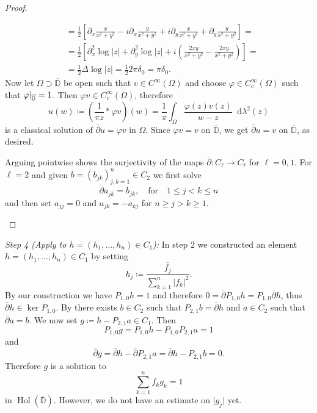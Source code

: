 \documentclass[letterpaper, 11pt]{article}
\newcommand{\D}{\mathbb{D}}
\newcommand{\1}{\mathds{1}}
\newcommand{\dd}{\mathop{}\!\mathrm{d}}
\newcommand{\cl}[1]{\overline{#1}}
\newcommand{\restr}[2]{{%
  \left.\kern-\nulldelimiterspace %
  #1 %
  \littletaller %
  \right|_{#2} %
  }}
\newcommand{\littletaller}{\mathchoice{\vphantom{\big|}}{}{}{}}
\newcommand{\wirtzbar}{\overline{\partial}}
\DeclareMathOperator*{\Hol}{Hol}
\theoremstyle{definition}
\newenvironment{innerproof}
 {\renewcommand{\qedsymbol}{}\proof}
 {\endproof}
\begin{document}
\begin{proof}{\ }
\begin{enumerate}
\begin{align*}
      &= \frac{1}{2} \left[ \partial_x \frac{x}{x^2 + y^2} - i \partial_x \frac{y}{x^2 + y^2} + i \partial_y \frac{x}{x^2 + y^2} + \partial_y \frac{y}{x^2 + y^2} \right] = \\
      &= \frac{1}{2} \left[ \partial^2_x \log \vert z \vert + \partial^2_y \log \vert z \vert + i \left( \frac{2xy}{x^2 + y^2} - \frac{2xy}{x^2 + y^2} \right) \right] = \\
      &= \frac{1}{2} \Delta \log \vert z \vert = \frac{1}{2} 2 \pi \delta_0 = \pi \delta_0.
    \end{align*}
    Now let $\Omega \supset \cl{\D}$ be open such that $v \in C^\infty(\Omega)$ and choose $\varphi \in C_c^\infty(\Omega)$ such that $\restr{\varphi}{\cl{\D}} = 1$. Then $\varphi v \in C_c^\infty(\Omega)$, therefore
    $$ u(w) \coloneqq \left(\frac{1}{\pi z} \ast \varphi v\right)(w) = \frac{1}{\pi} \int_\Omega \frac{\varphi(z) v(z)}{w - z} \dd \lambda^2(z) $$
    is a classical solution of $\wirtzbar u = \varphi v$ in $\Omega$. Since $\varphi v = v$ on $\cl{\D}$, we get $\wirtzbar u = v$ on $\cl\D$, as desired.

    Arguing pointwise shows the surjectivity of the maps $\wirtzbar : C_\ell \to C_\ell$ for $\ell = 0, 1$. For $\ell = 2$ and given $b = (b_{jk})_{j,k=1}^n \in C_2$ we first solve
    $$ \wirtzbar a_{jk} = b_{jk}, \quad \textrm{for} \quad 1 \leq j < k \leq n $$
    and then set $a_{jj} = 0$ and $a_{jk} = -a_{kj}$ for $n \geq j > k \geq 1$.
  \end{enumerate}
\end{proof}

\begin{innerproof}[Proof (continued)]
  \textit{Step 4 (Apply to $h = (h_1, \dots, h_n) \in C_1$):} In step 2 we constructed an element $h = (h_1, \dots, h_n) \in C_1$ by setting
  $$ h_j \coloneqq \frac{\bar{f_j}}{\sum_{k=1}^n \vert f_k \vert^2}. $$
  By our construction we have $P_{1,0} h = 1$ and therefore $0 = \wirtzbar P_{1,0} h = P_{1,0} \wirtzbar h$, thus $\wirtzbar h \in \ker P_{1,0}$. By  there exists $b \in C_2$ such that $P_{2,1} b = \wirtzbar h$ and $a \in C_2$ such that $\wirtzbar a = b$. We now set $g \coloneqq h - P_{2,1} a \in C_1$. Then
  $$ P_{1,0} g = P_{1,0} h - P_{1,0} P_{2,1} a = 1 $$
  and
  $$ \wirtzbar g = \wirtzbar h - \wirtzbar P_{2,1} a = \wirtzbar h - P_{2,1} b = 0. $$
  Therefore $g$ is a solution to
  $$ \sum_{k=1}^n f_k g_k = 1 $$
  in $\Hol(\cl{\D})$. However, we do not have an estimate on $\vert g_j \vert$ yet.
\end{innerproof}
\end{document}
